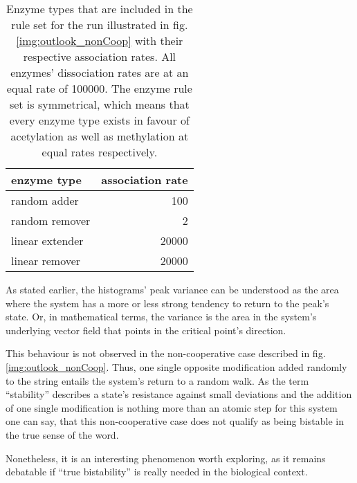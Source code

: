     \begin{table}[htbp!]
        \caption{Enzyme types that are included in the rule set for the run illustrated in fig. \ref{img:outlook_nonCoop} with their respective association rates. All enzymes' dissociation rates are at an equal rate of 100000. The enzyme rule set is symmetrical, which means that every enzyme type exists in favour of acetylation as well as methylation at equal rates respectively.}
        \begin{center}
            \begin{tabular}{l r}
                \hline
                \textbf{enzyme type} & \textbf{association rate} \\
                \hline
                random adder & 100 \\
                random remover & 2 \\
                linear extender & 20000 \\
                linear remover & 20000 \\
                \hline
            \end{tabular}
        \end{center}
        \label{img:enzymeRatesPeculiarCase}
    \end{table}

    As stated earlier, the histograms' peak variance can be understood as the area where the system has a more or less strong tendency to return to the peak's state. Or, in mathematical terms, the variance is the area in the system's underlying vector field that points in the critical point's direction.

    This behaviour is not observed in the non-cooperative case described in fig. \ref{img:outlook_nonCoop}. Thus, one single opposite modification added randomly to the string entails the system's return to a random walk. As the term “stability” describes a state's resistance against small deviations and the addition of one single modification is nothing more than an atomic step for this system %
    one can say, that this non-cooperative case does not qualify as being bistable in the true sense of the word.

    Nonetheless, it is an interesting phenomenon worth exploring, as it remains debatable if “true bistability” is really needed in the biological context.
